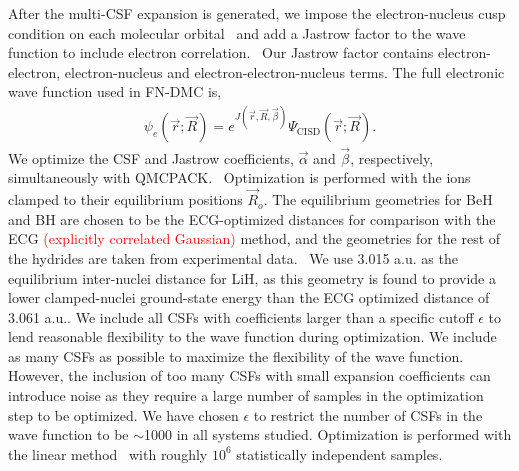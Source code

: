 \documentclass[aip,jcp,numerical,reprint]{revtex4-1}
\begin{document}
After the multi-CSF expansion is generated, we impose the electron-nucleus cusp condition on each molecular orbital~\cite{cusp} and add a Jastrow factor to the wave function to include electron correlation.~\cite{Kato} Our Jastrow factor contains electron-electron, electron-nucleus and electron-electron-nucleus terms. The full electronic wave function used in FN-DMC is,
\begin{align}
\psi_e(\vec{r};\vec{R})=e^{J(\vec{r},\vec{R},\vec{\beta})}\Psi_{\text{CISD}}(\vec{r};\vec{R})\label{eq:psie}.
\end{align}
We optimize the CSF and Jastrow coefficients, $\vec{\alpha}$ and $\vec{\beta}$, respectively, simultaneously with QMCPACK.~\cite{QMCPACK_Kim,QMCPACK_Esler} Optimization is performed with the ions clamped to their equilibrium positions $\vec{R}_o$. The equilibrium geometries for BeH and BH are chosen to be the ECG-optimized distances for comparison with the ECG \textcolor{red}{(explicitly correlated Gaussian)} method, and the geometries for the rest of the hydrides are taken from experimental data.~\cite{CCCBDB} We use 3.015 a.u. as the equilibrium inter-nuclei distance for LiH, as this geometry is found to provide a lower clamped-nuclei ground-state energy than the ECG optimized distance of 3.061 a.u.. We include all CSFs with coefficients larger than a specific cutoff $\epsilon$ to lend reasonable flexibility to the wave function during optimization. We include as many CSFs as possible to maximize the flexibility of the wave function. However, the inclusion of too many CSFs with small expansion coefficients can introduce noise as they require a large number of samples in the optimization step to be optimized. We have chosen $\epsilon$ to restrict the number of CSFs in the wave function to be $\sim$1000 in all systems studied. Optimization is performed with the linear method~\cite{Umrigar_Linear} with roughly $10^6$ statistically independent samples.%

%
\end{document}
